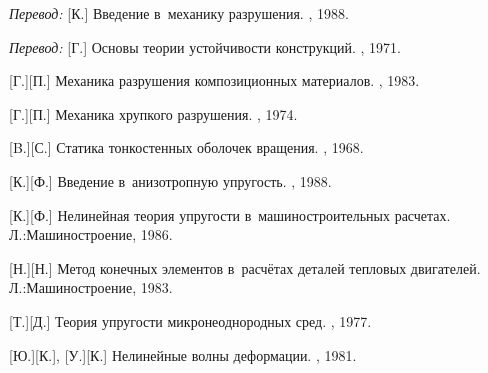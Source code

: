 \begin{thebibliography}{123}
\begin{otherlanguage}{russian}
\emph{Перевод:} [К.] Введение в~механику разрушения. \mirpublisher, 1988. 

\emph{Перевод:} [Г.] Основы теории устойчивости конструкций. \mirpublisher, 1971. 

[Г.][П.] Механика разрушения композиционных материалов. \naukapublisher, 1983. 

[Г.][П.] Механика хрупкого разрушения. \naukapublisher, 1974. 

[B.][С.] Статика тонкостенных оболочек вращения. \naukapublisher, 1968. 

[К.][Ф.] Введение в~анизотропную упругость. \naukapublisher, 1988. 

[К.][Ф.] Нелинейная теория упругости в~машиностроительных расчетах. Л.:\;Машино\-строение, 1986. 

[Н.][Н.] Метод конечных элементов в~расчётах деталей тепловых двигателей. Л.:\;Машино\-строение, 1983. 

[Т.][Д.] Теория упругости микронеоднородных сред. \naukapublisher, 1977. 

[Ю.][К.], [У.][К.] Нелинейные волны деформации. \naukapublisher, 1981. 

\end{otherlanguage}

\normalsize
\end{thebibliography}
